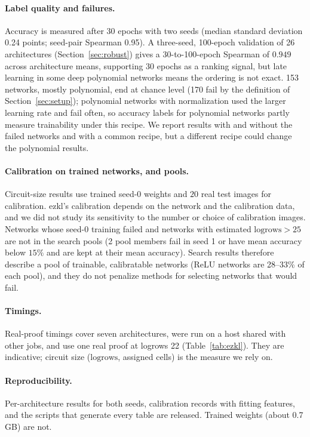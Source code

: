 \documentclass[10pt]{article}
\newcommand{\logrows}{\mathrm{logrows}}
\begin{document}
\paragraph{Label quality and failures.}
Accuracy is measured after 30 epochs with two seeds (median standard deviation 0.24 points; seed-pair Spearman 0.95).  A three-seed, 100-epoch validation of 26 architectures
(Section~\ref{sec:robust}) gives a 30-to-100-epoch Spearman of $0.949$ across architecture means, supporting 30 epochs as a ranking signal, but late learning in some deep polynomial networks means the ordering is not exact.
153 networks, mostly polynomial, end at chance level (170 fail by the definition of Section~\ref{sec:setup}); polynomial networks with normalization used the larger learning rate and fail often, so accuracy labels for polynomial networks partly measure trainability under this recipe.
We report results with and without the failed networks and with a common recipe, but a different recipe could change the polynomial results.

\paragraph{Calibration on trained networks, and pools.}
Circuit-size results use trained seed-0 weights and $20$ real test images for calibration.  ezkl's calibration depends on the network and the calibration data, and we did not study its sensitivity to the number or choice of calibration images.
Networks whose seed-0 training failed and networks with estimated $\logrows>25$ are not in the search pools (2 pool members fail in seed 1 or have mean accuracy below $15\%$ and are kept at their mean accuracy).  Search results therefore describe a pool of trainable, calibratable networks (ReLU networks are 28--33\% of each pool), and they do not penalize methods for selecting networks that would fail.

\paragraph{Timings.}
Real-proof timings cover seven architectures, were run on a host shared with other jobs, and use one real proof at logrows 22 (Table~\ref{tab:ezkl}).  They are indicative; circuit size ($\logrows$, assigned cells) is the measure we rely on.

\paragraph{Reproducibility.}
Per-architecture results for both seeds, calibration records with fitting features, and the scripts that generate every table are released.  Trained weights (about 0.7 GB) are not.
\end{document}

